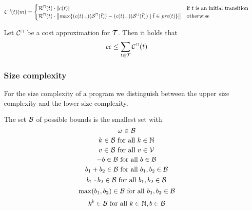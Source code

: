 \begin{definition}
  \[ {\mathcal{C}^\sqcap}(t)(m) =
  \begin{cases}
    {\mathcal{R}^\sqcap}(t) \cdot \left\Vert c(t)\right\Vert & \text{if } t \text{ is an initial transition} \\
    {\mathcal{R}^\sqcap}(t) \cdot \left\Vert\max \lbrace (c(t)_+)({\mathcal{S}^\sqcap}(\tilde{t})) - (c(t)_-)({\mathcal{S}^\sqcup}(\tilde{t})) \mid \tilde{t} \in \mathit{pre}(t) \rbrace\right\Vert & \text{otherwise}
  \end{cases}
  \]
\end{definition}

\begin{theorem}
	Let ${\mathcal{C}^\sqcap}$ be a cost approximation for $\mathcal{T}$.
	Then it holds that 
	\[ \mathit{cc} \leq \sum_{t \in \mathcal{T}} {\mathcal{C}^\sqcap}(t) \]
\end{theorem}

\subsubsection{Size complexity}

For the size complexity of a program we distinguish between the upper size complexity and the lower size complexity.


\begin{definition}
  The set $\mathcal{B}$ of possible bounds is the smallest set with
  \[ \omega \in \mathcal{B} \]
  \[ k \in \mathcal{B} \text{ for all } k \in \mathbb{N} \] 
  \[ v \in \mathcal{B} \text{ for all } v \in \mathcal{V} \] 
  \[ -b \in \mathcal{B} \text{ for all } b \in \mathcal{B} \] 
  \[ b_1 + b_2 \in \mathcal{B} \text{ for all } b_1, b_2 \in \mathcal{B} \] 
  \[ b_1 \cdot b_2 \in \mathcal{B} \text{ for all } b_1, b_2 \in \mathcal{B} \] 
  \[ \max(b_1, b_2) \in \mathcal{B} \text{ for all } b_1, b_2 \in \mathcal{B} \]
  \[ k^b \in \mathcal{B} \text{ for all } k \in \mathbb{N}, b \in \mathcal{B} \]
\end{definition}

